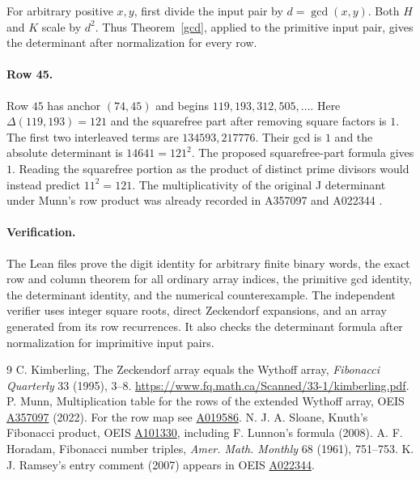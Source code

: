 \documentclass[11pt]{article}
\begin{document}
\newpage
For arbitrary positive $x,y$, first divide the input pair by $d=\gcd(x,y)$.
Both $H$ and $K$ scale by $d^2$. Thus Theorem~\ref{gcd}, applied to the primitive
input pair, gives the determinant after normalization for every row.

\paragraph{Row 45.}
Row $45$ has anchor $(74,45)$ and begins $119,193,312,505,\ldots$.
Here $\Delta(119,193)=121$ and the squarefree part after removing square
factors is $1$. The first two interleaved terms are $134593,217776$.
Their gcd is $1$ and the absolute determinant is $14641=121^2$. The proposed
squarefree-part formula gives $1$. Reading the squarefree portion as the product
of distinct prime divisors would instead predict $11^2=121$.
The multiplicativity of the original J determinant under Munn's row product
was already recorded in A357097 and A022344 \cite{munn,ramsey}.

\paragraph{Verification.}
The Lean files prove the digit identity for arbitrary finite binary words,
the exact row and column theorem for all ordinary array indices, the primitive gcd
identity, the determinant identity, and the numerical counterexample.
The independent verifier uses integer square roots, direct Zeckendorf expansions,
and an array generated from its row recurrences. It also checks the determinant
formula after normalization for imprimitive input pairs.

\begin{thebibliography}{9}
 C. Kimberling, The Zeckendorf array equals the Wythoff array,
\emph{Fibonacci Quarterly} 33 (1995), 3--8.
\url{https://www.fq.math.ca/Scanned/33-1/kimberling.pdf}.
 P. Munn, Multiplication table for the rows of the extended Wythoff array,
OEIS \href{https://oeis.org/A357097}{A357097} (2022).
For the row map see \href{https://oeis.org/A019586}{A019586}.
 N. J. A. Sloane, Knuth's Fibonacci product, OEIS
\href{https://oeis.org/A101330}{A101330}, including F. Lunnon's formula (2008).
 A. F. Horadam, Fibonacci number triples, \emph{Amer. Math.
Monthly} 68 (1961), 751--753. K. J. Ramsey's entry comment (2007) appears
in OEIS \href{https://oeis.org/A022344}{A022344}.
\end{thebibliography}
\end{document}
